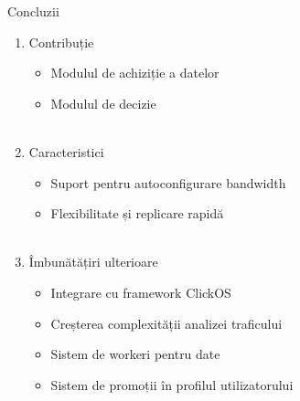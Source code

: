\documentclass{beamer}
\begin{document}
\begin{frame}{Concluzii}
\pause
\begin{enumerate} [<+->]
	\item Contribuție
		\begin{itemize} [<+->]
			\item Modulul de achiziție a datelor
			\item Modulul de decizie  \\~\\
		\end{itemize}
	\item Caracteristici
		\begin{itemize} [<+->]
			\item Suport pentru autoconfigurare bandwidth
			\item Flexibilitate și replicare rapidă  \\~\\
		\end{itemize}
	\item Îmbunătățiri ulterioare
		\begin{itemize} [<+->]
			\item Integrare cu framework ClickOS
			\item Creșterea complexității analizei traficului
			\item Sistem de workeri pentru date
			\item Sistem de promoții în profilul utilizatorului
		\end{itemize}		
\end{enumerate}
\end{frame}
\end{document}

